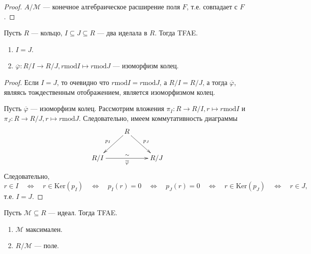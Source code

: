 \documentclass[12pt,a4paper]{article}
\renewcommand{\mod}{\mathrm{mod}}
\newcommand{\Ker}{\mathrm{Ker}}
\begin{document}
    \begin{proof}
        $A/\mathcal{M}$ --- конечное алгебраическое расширение поля $F$, т.е. совпадает с $F$.
    \end{proof}

    \begin{exercise}
        Пусть $R$ --- кольцо, $I \subseteq J \subseteq R$ --- два иделала в $R$. Тогда TFAE.
        \begin{enumerate}
            \item $I = J$.
            \item $\overline{\varphi}: R/I \to R/J, r \mathbin{\mod} I \mapsto r \mathbin{\mod} J$ --- изоморфизм колец.
        \end{enumerate}
    \end{exercise}

    \begin{proof}
        Если $I = J$, то очевидно что $r \mathbin{\mod} I = r \mathbin{\mod} J$, а $R/I = R/J$, а тогда $\overline{\varphi}$, являясь тождественным отображением, является изоморфизмом колец.

        Пусть $\overline{\varphi}$ --- изоморфизм колец. Рассмотрим вложения $\pi_I: R \to R/I, r \mapsto r \mathbin{\mod} I$ и $\pi_J: R \to R/J, r \mapsto r \mathbin{\mod} J$. Следовательно, имеем коммутативность диаграммы
        \[
            \xymatrix{
                & R \ar[dl]_{p_I} \ar[dr]^{p_J} &\\
                R/I \ar[rr]^{\sim}_{\overline{\varphi}} && R/J
            }
        \]
        Следовательно,
        \[
            r \in I
            \quad \Leftrightarrow \quad
            r \in \Ker(p_I)
            \quad \Leftrightarrow \quad
            p_I(r) = 0
            \quad \Leftrightarrow \quad
            p_J(r) = 0
            \quad \Leftrightarrow \quad
            r \in \Ker(p_J)
            \quad \Leftrightarrow \quad
            r \in J,
        \]
        т.е. $I=J$.
    \end{proof}

    \begin{exercise}
        Пусть $\mathcal{M} \subseteq R$ --- идеал. Тогда TFAE.
        \begin{enumerate}
            \item $\mathcal{M}$ максимален.
            \item $R/\mathcal{M}$ --- поле.
        \end{enumerate}
    \end{exercise}
\end{document}
